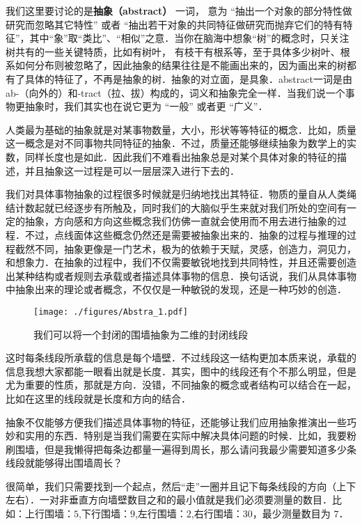 
我们这里要讨论的是\textbf{抽象（abstract）} 一词， 意为 “抽出一个对象的部分特性做研究而忽略其它特性” 或者 “抽出若干对象的共同特征做研究而抛弃它们的特有特征”，其中“象”取“类比”、“相似”之意．当你在脑海中想象“树”的概念时，只关注树共有的一些关键特质，比如有树叶， 有枝干有根系等，至于具体多少树叶、根系如何分布则被忽略了，因此抽象的结果往往是不能画出来的，因为画出来的树都有了具体的特征了，不再是抽象的树．抽象的对立面，是具象．abstract一词是由ab-（向外的）和-tract（拉、拔）构成的，词义和抽象完全一样．当我们说一个事物更抽象时，我们其实也在说它更为 “一般” 或者更 “广义”．


人类最为基础的抽象就是对某事物数量，大小，形状等等特征的概念．比如，质量这一概念是对不同事物共同特征的抽象．不过，质量还能够继续抽象为数学上的实数，同样长度也是如此．因此我们不难看出抽象总是对某个具体对象的特征的描述，并且抽象这一过程是可以一层层深入进行下去的．

我们对具体事物抽象的过程很多时候就是归纳地找出其特征．物质的量自从人类绳结计数起就已经逐步有所触及，同时我们的大脑似乎生来就对我们所处的空间有一定的抽象，方向感和方向这些概念我们仿佛一直就会使用而不用去进行抽象的过程．不过，点线面体这些概念仍然还是需要被抽象出来的．抽象的过程与推理的过程截然不同，抽象更像是一门艺术，极为的依赖于天赋，灵感，创造力，洞见力，和想象力．在抽象的过程中，我们不仅需要敏锐地找到共同特性，并且还需要创造出某种结构或者规则去承载或者描述具体事物的信息．换句话说，我们从具体事物中抽象出来的理论或者概念，不仅仅是一种敏锐的发现，还是一种巧妙的创造．

\begin{figure}[ht]
\centering
\texttt{[image: ./figures/Abstra\_1.pdf]}
\caption{我们可以将一个封闭的围墙抽象为二维的封闭线段} \label{Abstra_fig1}
\end{figure}

这时每条线段所承载的信息是每个墙壁．不过线段这一结构更加本质来说，承载的信息我想大家都能一眼看出就是长度．其实，图中的线段还有个不那么明显，但是尤为重要的性质，那就是方向．没错，不同抽象的概念或者结构可以结合在一起，比如在这里的线段就是长度和方向的结合．

抽象不仅能够方便我们描述具体事物的特征，还能够让我们应用抽象推演出一些巧妙和实用的东西．特别是当我们需要在实际中解决具体问题的时候．比如，我要粉刷围墙，但是我懒得把每条边都量一遍得到周长，那么请问我最少需要知道多少条线段就能够得出围墙周长？

很简单，我们只需要找到一个起点，然后“走”一圈并且记下每条线段的方向（上下左右）．一对非垂直方向墙壁数目之和的最小值就是我们必须要测量的数目．比如：上行围墙：$5$,下行围墙：$9$,左行围墙：$2$,右行围墙：$30$，最少测量数目为 $7$．

